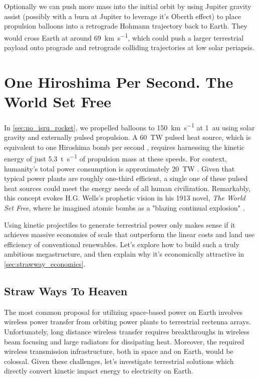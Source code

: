 \documentclass{article}
\begin{document}
{Optionally we can push more mass into the initial orbit by using Jupiter gravity assist (possibly with a burn at Jupiter to leverage it's Oberth effect) to place propulsion balloons into a retrograde Hohmann trajectory back to Earth.   They would cross Earth at around \SI{69}{\kilo\meter\per\second}, which could push a larger terrestrial payload onto  prograde and retrograde colliding trajectories at low solar periapsis.

\section{One Hiroshima Per Second. The World Set Free}\label{sec:world_set_free}
In \autoref{sec:no_isru_rocket}, we propelled balloons to \SI{150}{\kilo\meter\per\second} at \SI{1}{\astronomicalunit} using solar gravity and externally pulsed propulsion. A \SI{60}{\tera\watt} pulsed heat source, which is equivalent to one Hiroshima bomb per second \cite{hiroshima}, requires harnessing the kinetic energy of just \SI{5.3}{\tonne\per\second} of propulsion mass at these speeds. For context, humanity's total power consumption is approximately \SI{20}{\tera\watt} \cite{owid-energy-production-consumption}. Given that typical power plants are roughly one-third efficient, a single one of these pulsed heat sources could meet the energy needs of all human civilization.  Remarkably, this concept evokes H.G. Wells's prophetic vision in his 1913 novel, \textit{The World Set Free}, where he imagined atomic bombs as a "blazing continual explosion" \cite{wells1914world}.  

Using kinetic projectiles to generate terrestrial power only makes sense if it achieves massive economies of scale that outperform the linear costs and land use efficiency of conventional renewables.  Let's explore how to build such a truly ambitious megastructure, and then explain why it's economically attractive in \autoref{sec:strawway_economics}.     

\subsection{Straw Ways To Heaven}\label{sec:straw_way_to_heaven}
The most common proposal for utilizing space-based power on Earth involves wireless power transfer from orbiting power plants to terrestrial rectenna arrays.  Unfortunately, long distance wireless transfer requires breakthroughs in wireless beam focusing \cite{space_beaming_power} and large radiators for dissipating heat. Moreover, the required wireless transmission infrastructure, both in space and on Earth, would be colossal.  Given these challenges, let's investigate terrestrial solutions which directly convert kinetic impact energy to electricity on Earth.

}
\end{document}
